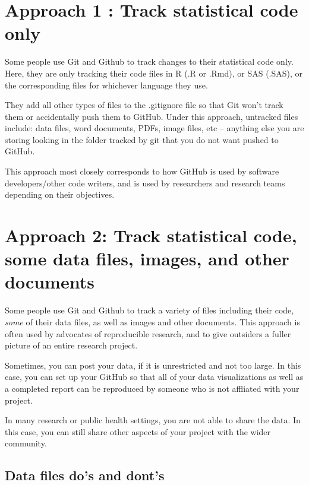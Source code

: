 \documentclass[
]{book}
\begin{document}
\section{Approach 1 : Track statistical code only}\label{approach-1-track-statistical-code-only}

Some people use Git and Github to track changes to their statistical code only.
Here, they are only tracking their code files in R (.R or .Rmd), or
SAS (.SAS), or the corresponding files for whichever language they use.

They add all other types of files to the .gitignore file so that Git
won't track them or accidentally push them to GitHub. Under this approach,
untracked files include: data files, word documents, PDFs, image files, etc --
anything else you are storing looking in the folder tracked by git that you do
not want pushed to GitHub.

This approach most closely corresponds to how GitHub is used by software
developers/other code writers, and is used by researchers and research
teams depending on their objectives.

\section{Approach 2: Track statistical code, some data files, images, and other documents}\label{approach-2-track-statistical-code-some-data-files-images-and-other-documents}

Some people use Git and Github to track a variety of files including their code,
\emph{some} of their data files, as well as images and other documents. This approach
is often used by advocates of reproducible research, and to give outsiders a
fuller picture of an entire research project.

Sometimes, you can post your data, if it is unrestricted and not too large. In
this case, you can set up your GitHub so that all of your data visualizations
as well as a completed report can be reproduced by someone who is not affliated
with your project.

In many research or public health settings, you are not able to share the data.
In this case, you can still share other aspects of your project with the wider
community.

\subsection{Data files do's and dont's}\label{data-files-dos-and-donts}
\end{document}
